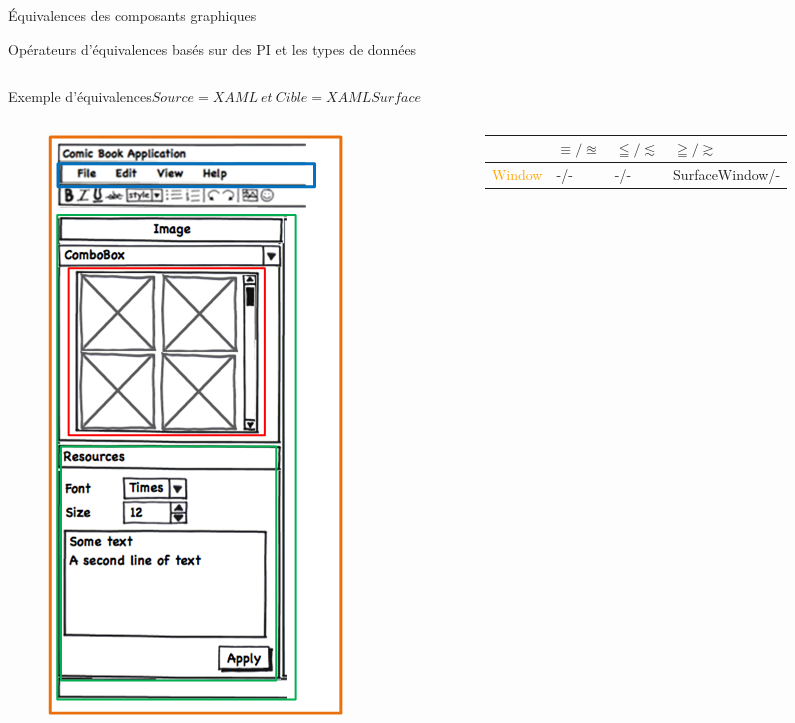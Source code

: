\documentclass[11pt]{beamer}
\begin{document}
\begin{frame}[t]{Équivalences des composants graphiques}
\begin{block}{{\scriptsize Opérateurs d'équivalences basés sur des PI et les types de données }}
\begin{columns}
\begin{column}{.7\textwidth}
\begin{center}
\end{center}
\end{column}
\end{columns}
\end{block}
\end{frame}

\begin{frame}[t]{Exemple d'équivalences}{\scriptsize $Source=XAML\  et\ Cible=XAMLSurface$}
\begin{columns}
	\begin{column}{.25\textwidth}
	\begin{figure}[t]
	\centering
	\includegraphics[scale=.27]{img/exempleequiv}
	\end{figure}
	\end{column}
	\begin{column}{.82\textwidth}
	\begin{table}[t]
		\begin{tabularx}{9cm}{|Y|Y|Y|Y|}
			\hline & $\equiv/\approxeq$ &  $  \leqq/ \lesssim $ & $ \geqq/\gtrsim$ \\
			\hline \textcolor{orange}{{\tiny Window }}&-/- &-/- & {\tiny SurfaceWindow}{\tiny /-} \\

\end{tabularx}
\end{table}
\end{column}
\end{columns}
\end{frame}
\end{document}
